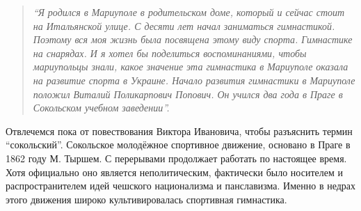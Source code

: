 \begin{quote}
\em\enquote{Я родился в Мариуполе в родительском доме, который и сейчас стоит на
Итальянской улице. С десяти лет начал заниматься гимнастикой. Поэтому вся моя
жизнь была посвящена этому виду спорта. Гимнастике на снарядах. И я хотел бы
поделиться воспоминаниями, чтобы мариупольцы знали, какое значение эта
гимнастика в Мариуполе оказала на развитие спорта в Украине. Начало развития
гимнастики в Мариуполе положил Виталий Поликарпович Попович. Он учился два года
в Праге в Сокольском учебном заведении}.
\end{quote}

Отвлечемся пока от повествования Виктора Ивановича, чтобы разъяснить термин
\enquote{сокольский}. Сокольское молодёжное спортивное движение, основано в Праге в
1862 году М. Тыршем. С перерывами продолжает работать по настоящее время. Хотя
официально оно является неполитическим, фактически было носителем и
распространителем идей чешского национализма и панславизма. Именно в недрах
этого движения широко культивировалась спортивная гимнастика.

